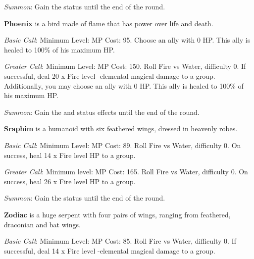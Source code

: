 \begin{multicols}{2}
    \textit{Summon}: Gain the  status until the end of the round.

    \ffcrystal[type=level,height=8pt]
    
    \textbf{Phoenix} is a bird made of flame that has power over life and death.
    
    \textit{Basic Call}: Minimum Level:  MP Cost: 95. Choose an ally with 0 HP\@. This ally is healed to 100\% of his maximum HP\@. 
    
    \textit{Greater Call}: Minimum Level:  MP Cost: 150. Roll Fire vs Water, difficulty 0. If successful, deal 20 x Fire level -elemental magical damage to a group. Additionally, you may choose an ally with 0 HP\@. This ally is healed to 100\% of his maximum HP\@. 
    
    \textit{Summon}: Gain the  and   status effects until the end of the round.

    \ffcrystal[type=level,height=8pt]
    
    \textbf{Sraphim} is a humanoid with six feathered wings, dressed in heavenly robes.
    
    \textit{Basic Call}: Minimum Level:  MP Cost: 89. Roll Fire vs Water, difficulty 0. On success, heal 14 x Fire level HP to a group.
    
    \textit{Greater Call}: Minimum level:  MP Cost: 165. Roll Fire vs Water, difficulty 0. On success, heal 26 x Fire level HP to a group.
    
    \textit{Summon}: Gain the  status until the end of the round.

    \ffcrystal[type=level,height=8pt]
    
    \textbf{Zodiac} is a huge serpent with four pairs of wings, ranging from feathered, draconian and bat wings.
    
    \textit{Basic Call}: Minimum Level:  MP Cost: 85. Roll Fire vs Water, difficulty 0. If successful, deal 14 x Fire level -elemental magical damage to a group.
    

\end{multicols}
